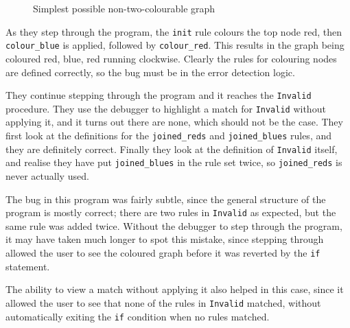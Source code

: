 \documentclass[authoryearcitations]{UoYCSproject}
\newenvironment{nscenter}
    {\parskip=0pt\par\nopagebreak\centering}
    {\par\noindent\ignorespacesafterend}
\begin{document}
\begin{figure}
    \begin{framed}
        \begin{nscenter}
        \end{nscenter}
    \end{framed}
    \caption{Simplest possible non-two-colourable graph}
    \label{fig:SimplestNonTwoColourableGraph}
\end{figure}

As they step through the program, the \texttt{init} rule colours the top node red,
then \texttt{colour\_blue} is applied, followed by \texttt{colour\_red}. This results
in the graph being coloured red, blue, red running clockwise. Clearly the rules
for colouring nodes are defined correctly, so the bug must be in the error
detection logic.

They continue stepping through the program and it reaches the \texttt{Invalid}
procedure. They use the debugger to highlight a match for \texttt{Invalid}
without applying it, and it turns out there are none, which should not be the
case. They first look at the definitions for the \texttt{joined\_reds} and
\texttt{joined\_blues} rules, and they are definitely correct. Finally they look
at the definition of \texttt{Invalid} itself, and realise they have put
\texttt{joined\_blues} in the rule set twice, so \texttt{joined\_reds} is never
actually used.

The bug in this program was fairly subtle, since the general structure of the
program is mostly correct; there are two rules in \texttt{Invalid} as expected,
but the same rule was added twice. Without the debugger to step through the
program, it may have taken much longer to spot this mistake, since stepping
through allowed the user to see the coloured graph before it was reverted by
the \texttt{if} statement.

The ability to view a match without applying it also helped in this case, since
it allowed the user to see that none of the rules in \texttt{Invalid} matched,
without automatically exiting the \texttt{if} condition when no rules matched.
\end{document}
